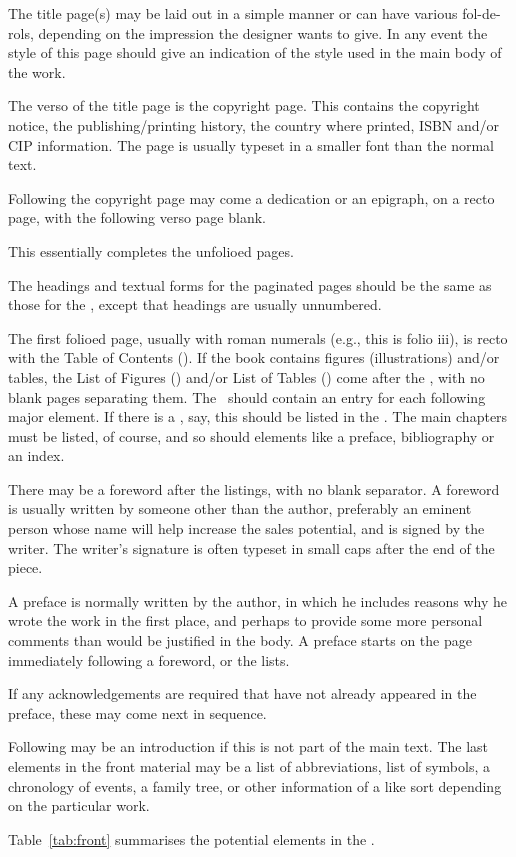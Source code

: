 \documentclass[10pt,a4paper,oneside,extrafontsizes]{memoir}%
\begin{document}
\begin{paracol}{2}
    The title page(s) may be laid out in a simple manner or can have various
fol-de-rols, depending on the impression the designer wants to give. In
any event the style of this page should give an indication of the style
used in the main body of the work.

    The verso of the title page is the copyright page.
This contains the copyright notice, the publishing/printing history, 
the country where printed, ISBN and/or CIP information. The page is usually 
typeset in a smaller font than the normal text.

    Following the copyright page may come a dedication or an epigraph, 
on a recto page, with the following verso page blank.

    This essentially completes the unfolioed pages.

    The headings and textual forms for the paginated 
pages should be the same as those for the \pixmainmatter, except that 
headings are usually unnumbered.

    The first folioed page,
usually with roman numerals (e.g., this is folio iii),
is recto with the Table of Contents (\toc). If the book contains 
figures (illustrations) 
and/or tables, the List of Figures (\lof) and/or List of Tables 
(\lot) come after the \toc, with no blank pages separating them. The \toc\ 
should contain an entry for each following major element. If there is a \lot, 
say, this should be listed in the \toc. The main chapters\index{chapter} must 
be listed, of course, and so should elements like a preface\index{preface}, 
bibliography\index{bibliography} or an index\index{index}.

    There may be a foreword after the listings, with no blank
separator. A foreword is usually written by someone other than the author, 
preferably an eminent person whose name will help increase the sales potential,
and is signed by the writer. The writer's
signature is often typeset in small caps after the end of the piece.

   A preface is normally written by the author, in which he
includes reasons why he wrote the work in the first place, and perhaps to 
provide some more personal comments than would be justified in the body. 
A preface starts on the page immediately following a foreword, or the lists.

   If any acknowledgements are required that have not already appeared in the
preface, these may come next in sequence.

   Following may be an introduction if this is not part of the main text. 
The last elements in the front material may be a list of abbreviations, list
of symbols, a chronology of events, a family tree, or other information of
a like sort depending on the particular work.

    Table~\ref{tab:front} summarises the potential elements in the 
\pixfrontmatter.
\end{paracol}
\end{document}
